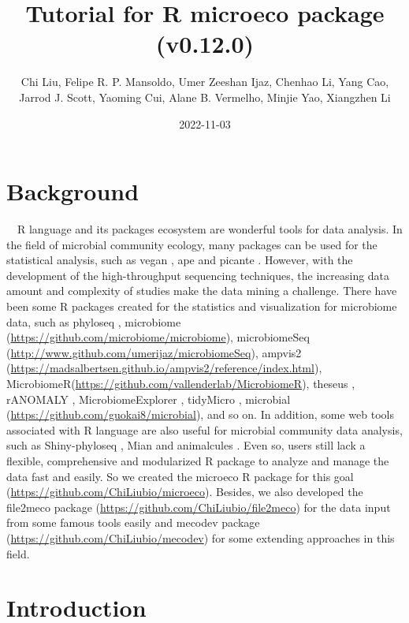 \documentclass[
]{book}
\title{Tutorial for R microeco package (v0.12.0)}
\author{Chi Liu, Felipe R. P. Mansoldo, Umer Zeeshan Ijaz, Chenhao Li, Yang Cao, Jarrod J. Scott, Yaoming Cui, Alane B. Vermelho, Minjie Yao, Xiangzhen Li}
\date{2022-11-03}
\begin{document}
\maketitle

{
\setcounter{tocdepth}{1}
\tableofcontents
}
\hypertarget{background}{%
\chapter{Background}\label{background}}

　R language \citep{R-base} and its packages ecosystem are wonderful tools for data analysis.
In the field of microbial community ecology, many packages can be used for the statistical analysis,
such as vegan \citep{Jari_vegan_2019}, ape \citep{Paradis_ape_2018} and picante \citep{Picante_Kembel_2010}.
However, with the development of the high-throughput sequencing techniques,
the increasing data amount and complexity of studies make the data mining a challenge.
There have been some R packages created for the statistics and visualization for microbiome data,
such as phyloseq \citep{Mcmurdie_phyloseq_2013},
microbiome (\url{https://github.com/microbiome/microbiome}), microbiomeSeq (\url{http://www.github.com/umerijaz/microbiomeSeq}),
ampvis2 (\url{https://madsalbertsen.github.io/ampvis2/reference/index.html}), MicrobiomeR(\url{https://github.com/vallenderlab/MicrobiomeR}),
theseus \citep{Price_theseus_2018}, rANOMALY \citep{Theil_rANOMALY_2021},
MicrobiomeExplorer \citep{Reeder_MicrobiomeExplorer_2021},
tidyMicro \citep{Carpenter_tidyMicro_2021}, microbial (\url{https://github.com/guokai8/microbial}),
and so on.
In addition, some web tools associated with R language are also useful for microbial community data analysis,
such as Shiny-phyloseq \citep{McMurdie_Shiny_2015}, Mian \citep{Jin_Mian_2021} and animalcules \citep{Zhao_animalcules_2021}.
Even so, users still lack a flexible, comprehensive and modularized R package to analyze and manage the data fast and easily.
So we created the microeco R package \citep{Liu_microeco_2021} for this goal (\url{https://github.com/ChiLiubio/microeco}).
Besides, we also developed the file2meco package (\url{https://github.com/ChiLiubio/file2meco}) for the data input from some famous tools easily
and mecodev package (\url{https://github.com/ChiLiubio/mecodev}) for some extending approaches in this field.

\hypertarget{intro}{%
\chapter{Introduction}\label{intro}}
\end{document}

